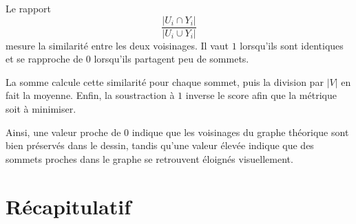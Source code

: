 \documentclass[a4paper,11pt]{article}
\begin{document}
Le rapport
\[
\frac{|U_i\cap Y_i|}{|U_i\cup Y_i|}
\]
mesure la similarité entre les deux voisinages. Il vaut $1$ lorsqu'ils sont identiques et se rapproche de $0$ lorsqu'ils partagent peu de sommets.

La somme calcule cette similarité pour chaque sommet, puis la division par $|V|$ en fait la moyenne. Enfin, la soustraction à $1$ inverse le score afin que la métrique soit à minimiser.

Ainsi, une valeur proche de $0$ indique que les voisinages du graphe théorique sont bien préservés dans le dessin, tandis qu'une valeur élevée indique que des sommets proches dans le graphe se retrouvent éloignés visuellement.


\section{Récapitulatif}
\end{document}
